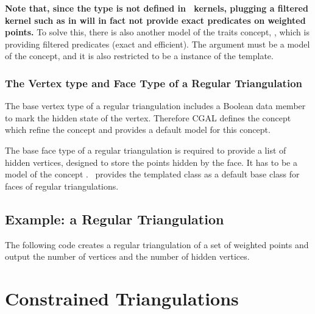 \textbf{Note that, since the type  is not defined 
in \cgal\ kernels, plugging a filtered kernel  such as 
 in
 will in fact
not provide exact predicates on  weighted points.}
To solve this, there is also another model of the traits concept,
, which is providing filtered
predicates (exact and efficient). The argument  must be a
model of the  concept, and it is also restricted to be a
instance of the  template. 



\subsubsection{The Vertex type and Face Type of a Regular Triangulation}

The base vertex type of a regular triangulation
includes a Boolean data member to mark the hidden state of the vertex.
Therefore  CGAL defines the concept
 which refine
the concept 
and provides a default model 
for this concept.

The base face type of a regular triangulation
is required to provide a list of hidden vertices,
designed to store the points hidden by the face. It has to be a model
of the concept .
\cgal\ provides the templated class 
as a default base class for faces of regular triangulations.



\subsection{Example: a Regular Triangulation\label{Subsection_2D_Triangulations_Regular_Example}}

The following code  creates a regular triangulation 
of a set of weighted points and output the number
of vertices and the number of hidden vertices.



\section{Constrained Triangulations\label{Section_2D_Triangulations_Constrained}}

